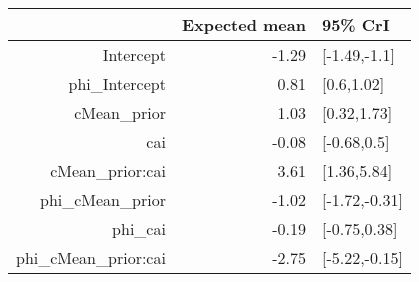 \begin{tabular}{rrl}
  \hline
 & Expected mean & 95\% CrI \\ 
  \hline
Intercept & -1.29 & [-1.49,-1.1] \\ 
  phi\_Intercept & 0.81 & [0.6,1.02] \\ 
  cMean\_prior & 1.03 & [0.32,1.73] \\ 
  cai & -0.08 & [-0.68,0.5] \\ 
  cMean\_prior:cai & 3.61 & [1.36,5.84] \\ 
  phi\_cMean\_prior & -1.02 & [-1.72,-0.31] \\ 
  phi\_cai & -0.19 & [-0.75,0.38] \\ 
  phi\_cMean\_prior:cai & -2.75 & [-5.22,-0.15] \\ 
   \hline
\end{tabular}

